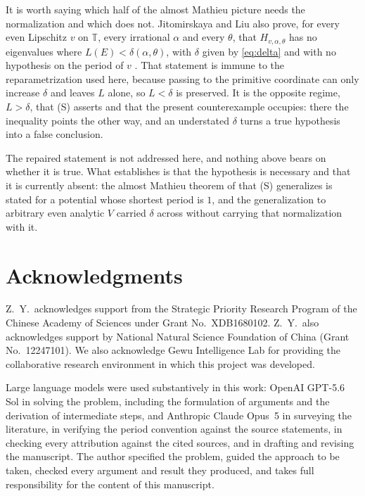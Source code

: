 \documentclass[11pt,reqno]{amsart}
\theoremstyle{plain}
\theoremstyle{definition}
\theoremstyle{remark}
\numberwithin{equation}{section}
\begin{document}
It is worth saying which half of the almost Mathieu picture needs the
normalization and which does not. Jitomirskaya and Liu also prove, for every
even Lipschitz $v$ on $\mathbb T$, every irrational $\alpha$ and every
$\theta$, that $H_{v,\alpha,\theta}$ has no eigenvalues where
$L(E)<\delta(\alpha,\theta)$, with $\delta$ given by \eqref{eq:delta} and
with no hypothesis on the period of $v$ \cite{Jitomirskaya_2024ur}. That
statement is immune to the reparametrization used here, because passing to the
primitive coordinate can only increase $\delta$ and leaves $L$ alone, so
$L<\delta$ is preserved. It is the opposite regime, $L>\delta$, that (S)
asserts and that the present counterexample occupies: there the inequality
points the other way, and an understated $\delta$ turns a true hypothesis
into a false conclusion.

The repaired statement is not addressed here, and nothing above bears on
whether it is true. What  establishes is that the hypothesis
is necessary and that it is currently absent: the almost Mathieu theorem of
\cite{Jitomirskaya_2024ur,Jitomirskaya_2023od} that (S) generalizes is stated
for a potential whose shortest period is $1$, and the generalization to
arbitrary even analytic $V$ carried $\delta$ across without carrying that
normalization with it.

\section*{Acknowledgments}

Z.\ Y.\ acknowledges support from the Strategic Priority Research Program of the
Chinese Academy of Sciences under Grant No.~XDB1680102. Z.\ Y.\ also
acknowledges support by National Natural Science Foundation of China (Grant
No.~12247101). We also acknowledge Gewu Intelligence Lab for providing the
collaborative research environment in which this project was developed.

Large language models were used substantively in this work: OpenAI GPT-5.6 Sol
in solving the problem, including the formulation of arguments and the
derivation of intermediate steps, and Anthropic Claude Opus~5 in surveying the
literature, in verifying the period convention against the source statements,
in checking every attribution against the cited sources, and in drafting and
revising the manuscript. The author specified the problem,
guided the approach to be taken, checked every argument and result they
produced, and takes full responsibility for the content of this manuscript.



\end{document}

